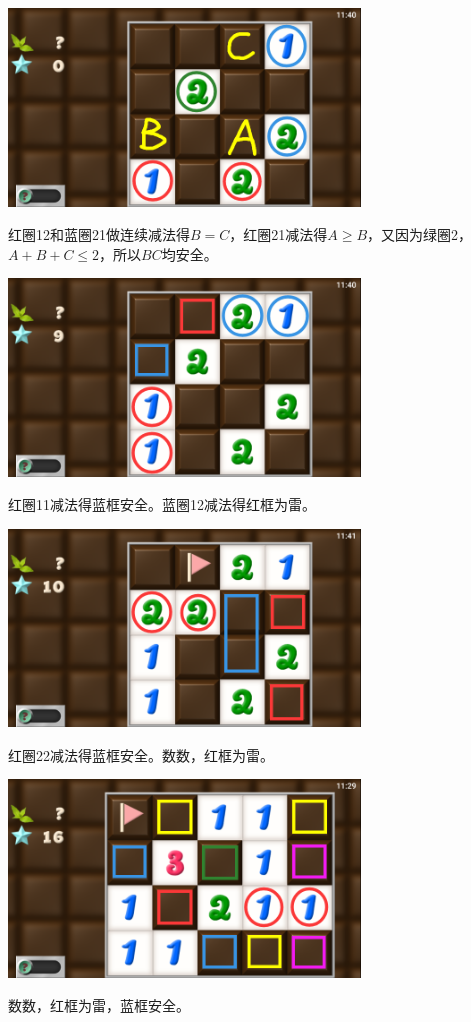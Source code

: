 \subsection{} %
\begin{center}
    \includegraphics[width=0.7\textwidth]{puzzle/167-1.png}
\end{center}
红圈12和蓝圈21做连续减法得$B=C$，红圈21减法得$A\ge B$，又因为绿圈2，$A+B+C\le 2$，所以$BC$均安全。
\begin{center}
    \includegraphics[width=0.7\textwidth]{puzzle/167-2.png}
\end{center}
红圈11减法得蓝框安全。蓝圈12减法得红框为雷。
\begin{center}
    \includegraphics[width=0.7\textwidth]{puzzle/167-3.png}
\end{center}
红圈22减法得蓝框安全。数数，红框为雷。
\begin{center}
    \includegraphics[width=0.7\textwidth]{puzzle/165-4.png}
\end{center}
数数，红框为雷，蓝框安全。


